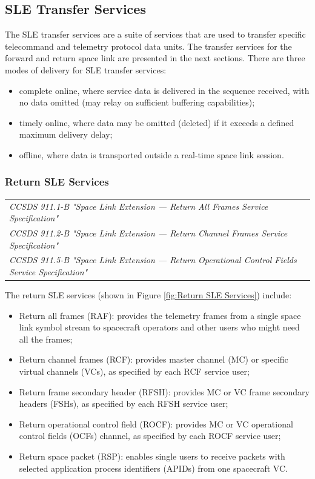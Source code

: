 \subsection{SLE Transfer Services}

The SLE transfer services are a suite of services that are used to transfer specific telecommand and telemetry protocol data units. The transfer services for the forward and return space link are presented in the next sections. There are three modes of delivery for SLE transfer services:

\begin{itemize}
\item complete online, where service data is delivered in the sequence received, with no data omitted (may relay on sufficient buffering capabilities);
\item timely online, where data may be omitted (deleted) if it exceeds a defined maximum delivery delay;
\item offline, where data is transported outside a real-time space link session.
\end{itemize}

\subsubsection{Return SLE Services}

\begin{tabular}{l}
\textit{CCSDS 911.1-B "Space Link Extension — Return All Frames Service Specification" \cite{CCSDS-911.1-B}} \\
\textit{CCSDS 911.2-B "Space Link Extension — Return Channel Frames Service Specification" \cite{CCSDS-911.2-B}} \\
\textit{CCSDS 911.5-B "Space Link Extension — Return Operational Control Fields Service Specification" \cite{CCSDS-911.5-B}} \\
\end{tabular}

The return SLE services (shown in Figure \ref{fig:Return SLE Services}) include: 

\begin{itemize}
\item Return all frames (RAF): provides the telemetry frames from a single space link symbol stream to spacecraft operators and other users who might need all the frames;
\item Return channel frames (RCF): provides master channel (MC) or specific virtual channels (VCs), as specified by each RCF service user;
\item Return frame secondary header (RFSH): provides MC or VC frame secondary headers (FSHs), as specified by each RFSH service user; 
\item Return operational control field (ROCF): provides MC or VC operational control fields (OCFs) channel, as specified by each ROCF service user; 
\item Return space packet (RSP): enables single users to receive packets with selected application process identifiers (APIDs) from one spacecraft VC.
\end{itemize}

